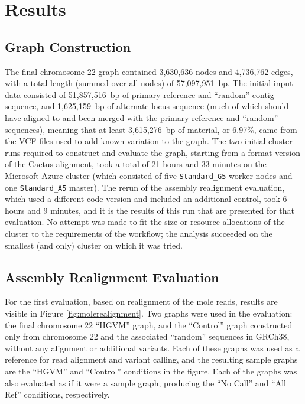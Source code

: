 \section{Results}

\subsection{Graph Construction}

The final chromosome 22 graph contained 3,630,636 nodes and 4,736,762 edges, with a total length (summed over all nodes) of 57,097,951~bp. The initial input data consisted of 51,857,516~bp of primary reference and ``random'' contig sequence, and 1,625,159~bp of alternate locus sequence (much of which should have aligned to and been merged with the primary reference and ``random'' sequences), meaning that at least 3,615,276~bp of material, or 6.97\%, came from the VCF files used to add known variation to the graph. %
The two initial cluster runs required to construct and evaluate the graph, starting from a \vg format version of the Cactus alignment, took a total of 21 hours and 33 minutes on the Microsoft Azure cluster (which consisted of five \texttt{Standard\_G5} worker nodes and one \texttt{Standard\_A5} master). The rerun of the assembly realignment evaluation, which used a different code version and included an additional control, took 6 hours and 9 minutes, and it is the results of this run that are presented for that evaluation. No attempt was made to fit the size or resource allocations of the cluster to the requirements of the workflow; the analysis succeeded on the smallest (and only) cluster on which it was tried.

\subsection{Assembly Realignment Evaluation}

For the first evaluation, based on realignment of the mole reads, results are visible in Figure \ref{fig:molerealignment}. Two graphs were used in the evaluation: the final chromosome 22 ``HGVM'' graph, and the ``Control'' graph constructed only from chromosome 22 and the associated ``random'' sequences in GRCh38, without any alignment or additional variants. Each of these graphs was used as a reference for read alignment and variant calling, and the resulting sample graphs are the ``HGVM'' and ``Control'' conditions in the figure. Each of the graphs was also evaluated as if it were a sample graph, producing the ``No Call'' and ``All Ref'' conditions, respectively.

